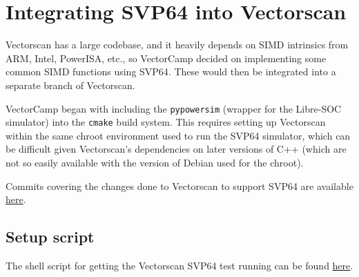 %
\section{Integrating \acrshort{SVP64} into Vectorscan}

Vectorscan has a large codebase, and it heavily depends on \acrshort{SIMD} intrinsics from
\acrshort{ARM}, Intel, PowerISA, etc., so VectorCamp decided on implementing some common
\acrshort{SIMD} functions using \acrshort{SVP64}. These would then be integrated into a separate
branch of Vectorscan.

VectorCamp began with including the \texttt{pypowersim} (wrapper for the
Libre-SOC simulator) into the \texttt{cmake} build system. This requires
setting up Vectorscan within the same chroot environment used to run the SVP64
simulator, which can be difficult given Vectorscan's dependencies on later
versions of C++ (which are not so easily available with the version of Debian
used for the chroot).

Commits covering the changes done to Vectorscan to support \acrshort{SVP64} are available
\href{https://github.com/ngisearchsvp64/vectorscan/commits/feature/svp64-port/}{here}.

\subsection{Setup script}
The shell script for getting the Vectorscan \acrshort{SVP64} test running can be found
\href{https://github.com/ngisearchsvp64/shell-scripts/blob/main/scripts/ngi-search-vectorscan}{here}.


